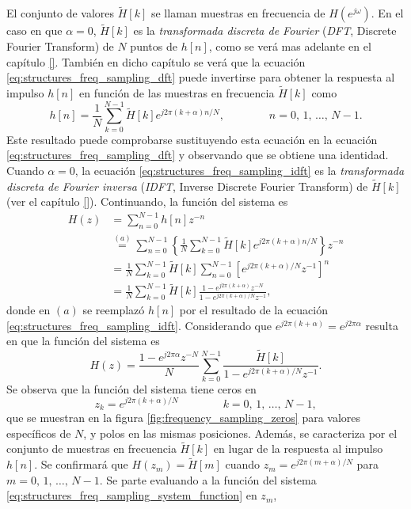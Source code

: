 \documentclass[a4paper]{report}
\begin{document}
El conjunto de valores \(\tilde{H}[k]\) se llaman muestras en frecuencia de \(H(e^{j\omega})\). En el caso en que \(\alpha=0\), \(\tilde{H}[k]\) es la \emph{transformada discreta de Fourier} (\emph{DFT}, Discrete Fourier Transform) de \(N\) puntos de \(h[n]\), como se verá mas adelante en el capítulo \ref{}. También en dicho capítulo se verá que la ecuación \ref{eq:structures_freq_sampling_dft} puede invertirse para obtener la respuesta al impulso \(h[n]\) en función de las muestras en frecuencia \(\tilde{H}[k]\) como
\begin{equation}\label{eq:structures_freq_sampling_idft}
 h[n]=\frac{1}{N}\sum_{k=0}^{N-1}\tilde{H}[k]e^{j2\pi(k+\alpha)n/N},
 \qquad\qquad 
 n=0,\,1,\,\dots,\,N-1.  
\end{equation}
Este resultado puede comprobarse sustituyendo esta ecuación en la ecuación \ref{eq:structures_freq_sampling_dft} y observando que se obtiene una identidad. Cuando \(\alpha=0\), la ecuación \ref{eq:structures_freq_sampling_idft} es la \emph{transformada discreta de Fourier inversa} (\emph{IDFT}, Inverse Discrete Fourier Transform) de \(\tilde{H}[k]\) (ver el capítulo \ref{}). Continuando, la función del sistema es
\begin{align*}
 H(z)&=\sum_{n=0}^{N-1}h[n]z^{-n}\\
  &\overset{(a)}{=}\sum_{n=0}^{N-1}\left\{\frac{1}{N}\sum_{k=0}^{N-1}\tilde{H}[k]e^{j2\pi(k+\alpha)n/N}\right\}z^{-n}\\
  &=\frac{1}{N}\sum_{k=0}^{N-1}\tilde{H}[k]\sum_{n=0}^{N-1}\left[e^{j2\pi(k+\alpha)/N}z^{-1}\right]^n\\
  &=\frac{1}{N}\sum_{k=0}^{N-1}\tilde{H}[k]\frac{1-e^{j2\pi(k+\alpha)}z^{-N}}{1-e^{j2\pi(k+\alpha)/N}z^{-1}},
\end{align*}
donde en \((a)\) se reemplazó \(h[n]\) por el resultado de la ecuación \ref{eq:structures_freq_sampling_idft}. Considerando que \(e^{j2\pi(k+\alpha)}=e^{j2\pi\alpha}\) resulta en que la función del sistema es
\begin{equation}\label{eq:structures_freq_sampling_system_function}
 H(z)=\frac{1-e^{j2\pi\alpha}z^{-N}}{N}\sum_{k=0}^{N-1}\frac{\tilde{H}[k]}{1-e^{j2\pi(k+\alpha)/N}z^{-1}}.
\end{equation}
Se observa que la función del sistema tiene ceros en 
\[
 z_k=e^{j2\pi(k+\alpha)/N}
 \qquad\qquad 
 k=0,\,1,\,\dots,\,N-1,  
\]
que se muestran en la figura \ref{fig:frequency_sampling_zeros} para valores específicos de \(N\), y polos en las mismas posiciones. Además, se caracteriza por el conjunto de muestras en frecuencia \(\tilde{H}[k]\) en lugar de la respuesta al impulso \(h[n]\). Se confirmará que \(H(z_m)=\tilde{H}[m]\) cuando \(z_m=e^{j2\pi(m+\alpha)/N}\) para \(m=0,\,1,\,\dots,\,N-1\). Se parte evaluando a la función del sistema \ref{eq:structures_freq_sampling_system_function} en \(z_m\),
\end{document}
